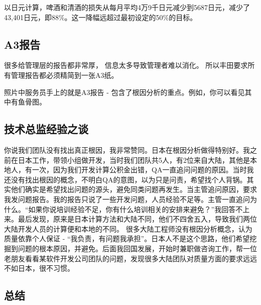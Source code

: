 以日元计算，啤酒和清酒的损失从每月平均4万9千日元减少到5687日元，减少了43,401日元，即88\%。这一降幅远超过最初设定的50\%的目标。

\hypertarget{a3ux62a5ux544a}{%
\subsection{A3报告}\label{a3ux62a5ux544a}}

很多给管理层的报告都非常厚， 信息太多导致管理者难以消化。
所以丰田要求所有管理报告都必须精简到一张A3纸。

照片中服务员手上的就是A3报告 -
包含了根因分析的重点。例如，你可以看见其中有鱼骨图。

\hypertarget{ux6280ux672fux603bux76d1ux7ecfux9a8cux4e4bux8c08}{%
\subsection{技术总监经验之谈}\label{ux6280ux672fux603bux76d1ux7ecfux9a8cux4e4bux8c08}}


你说我们团队没有找出真正根因，我非常赞同。日本在根因分析做得特别好。我之前在日本工作，带领小组做开发，当时我们团队共5人，有2位来自大陆，其他是本地人，有一次，因为我们开发计算公积金出错，QA一直追问问题的原因。当时我还没有找出根因的概念，不明白QA的意图，以为只是问责，希望找个人背锅。其实他们确实是希望找出问题的源头，避免同类问题再发生。当主管追问原因，要求我发问题报告。我的报告只说了一些开发问题，人员经验不足等。主管一直追问为什么。``如果你说培训经验不足，你有什么培训相关的安排来避免？''我回答不上来。最后发现，原来是日本计算方法和大陆不同，他们不四舍五入，导致我们两位大陆开发人员的计算便和本地的不同。
很多大陆工程师没有根因分析概念，认为质量依靠个人保证 -
``我负责，有问题我承担''。日本人不是这个思路，他们希望挖掘到问题的根本原因，并避免。后面我回国发展，开始时兼职做咨询工作，帮一位老朋友看看某软件开发公司团队的问题，发现很多大陆团队对质量方面的要求远远不如日本，很不习惯。

\hypertarget{ux603bux7ed3}{%
\subsection{总结}\label{ux603bux7ed3}}

